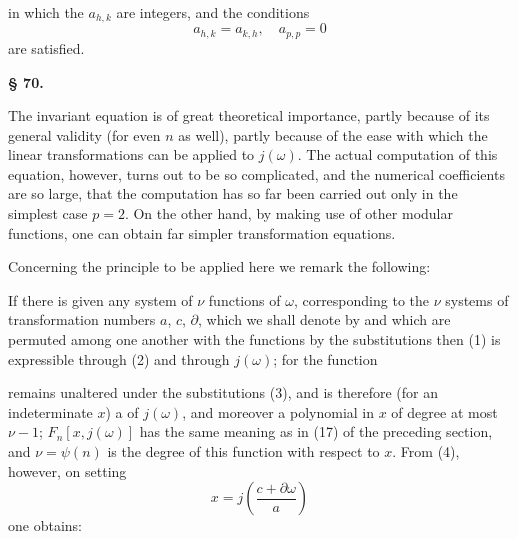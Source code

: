 in which the $a_{h,k}$ are integers, and the conditions
\[
a_{h,k} = a_{k,h}, \quad a_{p,p} = 0
\]
are satisfied.

\begin{center}
\textbf{§ 70.\quad {}}
\end{center}

The invariant equation is of great theoretical importance, partly because
of its general validity (for even $n$ as well), partly because of the ease
with which the linear transformations can be applied to $j(\omega)$. The
actual computation of this equation, however, turns out to be so complicated, and
the numerical coefficients are so large, that the computation has so far
been carried out only in the simplest case $p=2$. On the other hand, by
making use of other modular functions, one can obtain far simpler
transformation equations.

Concerning the principle to be applied here we remark the following:

If there is given any system of $\nu$ functions of $\omega$, corresponding
to the $\nu$ systems of transformation numbers $a$, $c$, $\partial$, which
we shall denote by
and which are permuted among one another  with the functions
by the substitutions
then (1) is expressible  through (2) and through $j(\omega)$; for
the function


remains unaltered under the substitutions (3), and is therefore (for an
indeterminate $x$) a  of $j(\omega)$, and moreover a
polynomial in $x$ of degree at most $\nu-1$;
$F_n[x,j(\omega)]$ has the same meaning as in (17) of the preceding
section, and $\nu=\psi(n)$ is the degree of this function with respect to
$x$. From (4), however, on setting
\[
x = j\left(\frac{c+\partial\omega}{a}\right)
\]
one obtains:
